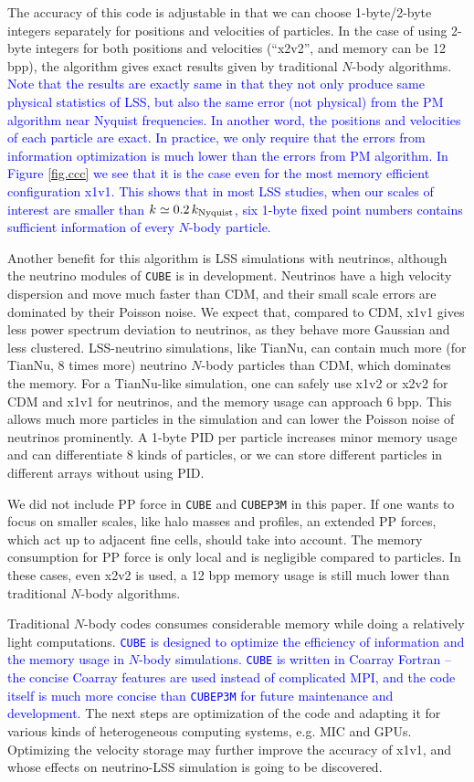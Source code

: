 \documentclass[10pt,twocolumn,preprint]{emulateapj}
\newcommand{\tcb}{\textcolor{blue}}
\begin{document}
The accuracy of this code is adjustable in that we can choose 1-byte/2-byte integers separately for positions and velocities of particles. In the case of using 2-byte integers for both positions and velocities (``x2v2'', and memory can be 12 bpp), the algorithm gives exact results given by traditional $N$-body algorithms. \tcb{Note that the results are exactly same in that they not only produce same physical statistics of LSS, but also the same error (not physical) from the PM algorithm near Nyquist frequencies. In another word, the positions and velocities of each particle are exact. In practice, we only require that the errors from information optimization is much lower than the errors from PM algorithm. In Figure \ref{fig.ccc} we see that it is the case even for the most memory efficient configuration x1v1. This shows that in most LSS studies, when our scales of interest are smaller than $k\simeq 0.2\,k_{\rm Nyquist}$, six 1-byte fixed point numbers contains sufficient information of every $N$-body particle.}

Another benefit for this algorithm is LSS simulations with neutrinos, although the neutrino modules of {\tt CUBE} is in development. Neutrinos have a high velocity dispersion and move much faster than CDM, and their small scale errors are dominated by their Poisson noise. We expect that, compared to CDM, x1v1 gives less power spectrum deviation to neutrinos, as they behave more Gaussian and less clustered. LSS-neutrino simulations, like TianNu, can contain much more (for TianNu, 8 times more) neutrino $N$-body particles than CDM, which dominates the memory. For a TianNu-like simulation, one can safely use x1v2 or x2v2 for CDM and x1v1 for neutrinos, and the memory usage can approach 6 bpp. This allows much more particles in the simulation and can lower the Poisson noise of neutrinos prominently. A 1-byte PID per particle increases minor memory usage and can differentiate 8 kinds of particles, or we can store different particles in different arrays without using PID.

We did not include PP force in {\tt CUBE} and {\tt CUBEP3M} in this paper. If one wants to focus on smaller scales, like halo masses and profiles, an extended PP forces, which act up to adjacent fine cells, should take into account. The memory consumption for PP force is only local and is negligible compared to particles. In these cases, even x2v2 is used, a 12 bpp memory usage is still much lower than traditional $N$-body algorithms.

Traditional $N$-body codes consumes considerable memory while doing a relatively light computations. \tcb{{\tt CUBE} is designed to optimize the efficiency of information and the memory usage in $N$-body simulations. {\tt CUBE} is written in Coarray Fortran -- the concise Coarray features are used instead of complicated MPI, and the code itself is much more concise than {\tt CUBEP3M} for future maintenance and development.} The next steps are optimization of the code and adapting it for various kinds of heterogeneous computing systems, e.g. MIC and GPUs. Optimizing the velocity storage may further improve the accuracy of x1v1, and whose effects on neutrino-LSS simulation is going to be discovered.
\end{document}
